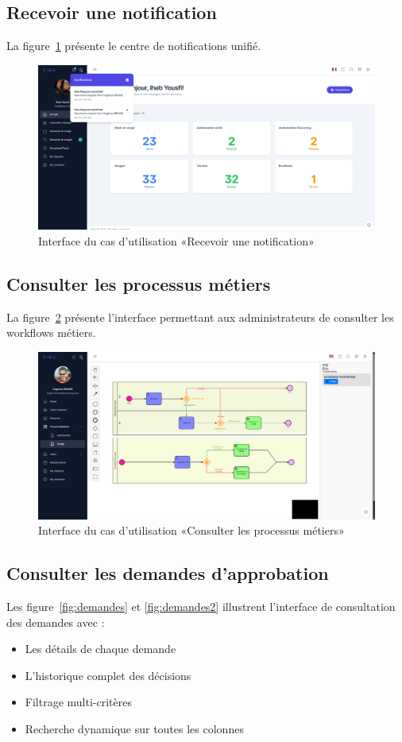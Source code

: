 \subsection{Recevoir une notification}
La figure~\ref{fig:notifications} présente le centre de notifications unifié.
\begin{figure}[h]
    \centering
    \includegraphics[width=16cm]{images/realisation/notif.png}
    \caption{Interface du cas d'utilisation «Recevoir une notification»}
    \label{fig:notifications}
\end{figure}

\subsection{Consulter les processus métiers}
La figure~\ref{fig:processus} présente l'interface permettant aux administrateurs de consulter les workflows métiers.
\newpage
\begin{figure}[h]
    \centering
    \includegraphics[width=16cm]{images/realisation/processes.png}
    \caption{Interface du cas d'utilisation «Consulter les processus métiers»}
    \label{fig:processus}
\end{figure}
\subsection{Consulter les demandes d’approbation}
Les figure~\ref{fig:demandes} et \ref{fig:demandes2} illustrent l'interface de consultation des demandes avec :
\begin{itemize}
    \item Les détails de chaque demande
    \item L'historique complet des décisions
    \item Filtrage multi-critères
    \item Recherche dynamique sur toutes les colonnes
\end{itemize}

